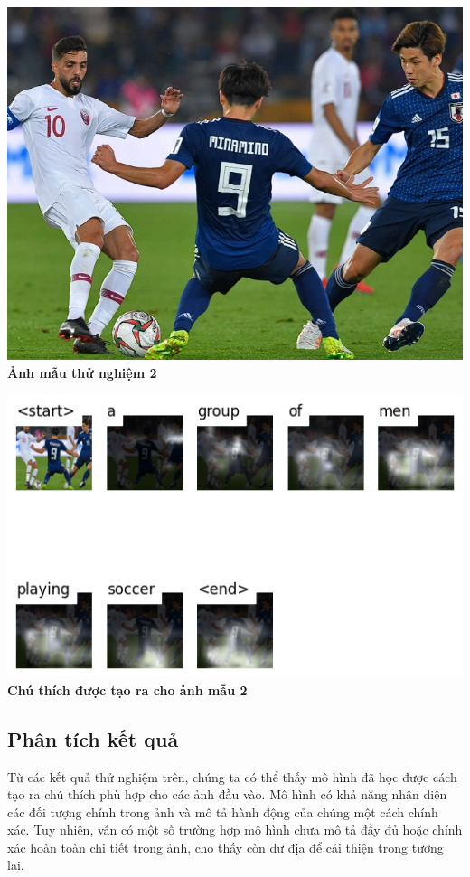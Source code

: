 \documentclass[conference]{IEEEtran}
\begin{document}
\begin{center}
    \begin{minipage}[b]{0.48\textwidth}
        \centering
        \includegraphics[width=\linewidth]{attachments/test01.jpg}
        \vspace{0.2cm}
        \textbf{Ảnh mẫu thử nghiệm 2}
    \end{minipage}
    \hfill
    \begin{minipage}[b]{0.48\textwidth}
        \centering
        \includegraphics[width=\linewidth]{attachments/test01_caption.jpg}
        \vspace{0.2cm}
        \textbf{Chú thích được tạo ra cho ảnh mẫu 2}
    \end{minipage}
\end{center}

\subsection{Phân tích kết quả}
Từ các kết quả thử nghiệm trên, chúng ta có thể thấy mô hình đã học được cách tạo ra chú thích phù hợp cho các ảnh đầu vào. Mô hình có khả năng nhận diện các đối tượng chính trong ảnh và mô tả hành động của chúng một cách chính xác. Tuy nhiên, vẫn có một số trường hợp mô hình chưa mô tả đầy đủ hoặc chính xác hoàn toàn chi tiết trong ảnh, cho thấy còn dư địa để cải thiện trong tương lai.
\end{document}
